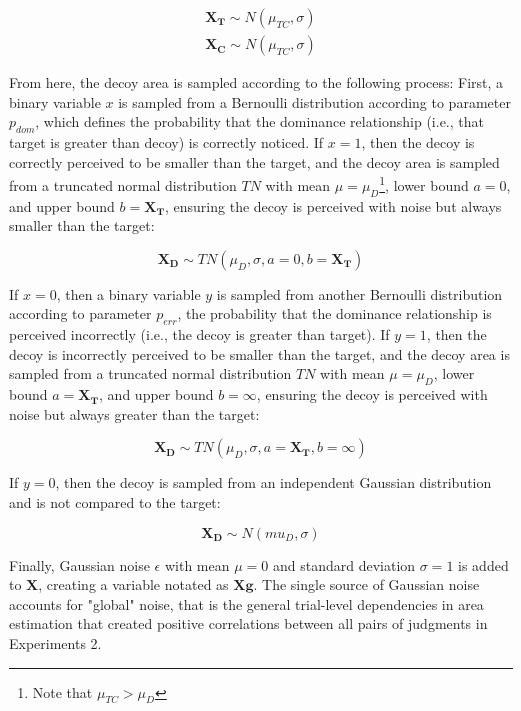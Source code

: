 \begin{align}
   \bm{X_{T}}\sim N(\mu_{TC},\sigma) \\
   \bm{X_{C}}\sim N(\mu_{TC},\sigma)
\end{align}

From here, the decoy area is sampled according to the following process:
First, a binary variable $x$ is sampled from a Bernoulli distribution according to parameter $p_{dom}$, which defines the probability that the dominance relationship (i.e., that target is greater than decoy) is correctly noticed. If $x=1$, then the decoy is correctly perceived to be smaller than the target, and the decoy area is sampled from a truncated normal distribution $TN$ with mean $\mu=\mu_{D}$\footnote{Note that $\mu_{TC}>\mu_{D}$}, lower bound $a=0$, and upper bound $b=\bm{X_{T}}$, ensuring the decoy is perceived with noise but always smaller than the target:

\begin{equation}
   \bm{X_{D}}\sim TN(\mu_{D},\sigma,a=0,b=\bm{X_{T}})
\end{equation}

If $x=0$, then a binary variable $y$ is sampled from another Bernoulli distribution according to parameter $p_{err}$, the probability that the dominance relationship is perceived incorrectly (i.e., the decoy is greater than target). If $y=1$, then the decoy is incorrectly perceived to be smaller than the target, and the decoy area is sampled from a truncated normal distribution $TN$ with mean $\mu=\mu_{D}$, lower bound $a=\bm{X_{T}}$, and upper bound $b=\infty$, ensuring the decoy is perceived with noise but always greater than the target:

\begin{equation}
   \bm{X_{D}}\sim TN(\mu_{D},\sigma,a=\bm{X_{T}},b=\infty)
\end{equation}

If $y=0$, then the decoy is sampled from an independent Gaussian distribution and is not compared to the target:

\begin{equation}
   \bm{X_{D}} \sim N(mu_{D},\sigma)
\end{equation}

Finally, Gaussian noise $\epsilon$ with mean $\mu=0$ and standard deviation $\sigma=1$ is added to $\bm{X}$, creating a variable notated as $\bm{Xg}$. The single source of Gaussian noise accounts for "global" noise, that is the general trial-level dependencies in area estimation that created positive correlations between all pairs of judgments in Experiments 2.

